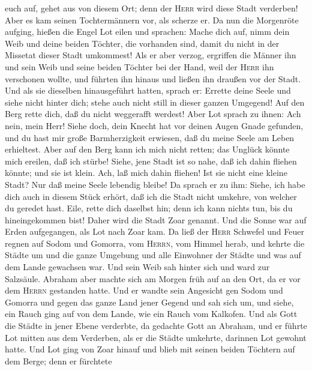euch auf, gehet aus von diesem Ort; denn der \textsc{Herr} wird diese
Stadt verderben! Aber es kam seinen Tochtermännern vor, als scherze er.
 Da nun die Morgenröte aufging, hießen die Engel Lot
eilen und sprachen: Mache dich auf, nimm dein Weib und deine beiden
Töchter, die vorhanden sind, damit du nicht in der Missetat dieser Stadt
umkommest!  Als er aber verzog, ergriffen die Männer ihn
und sein Weib und seine beiden Töchter bei der Hand, weil der
\textsc{Herr} ihn verschonen wollte, und führten ihn hinaus und ließen
ihn draußen vor der Stadt.  Und als sie dieselben
hinausgeführt hatten, sprach er: Errette deine Seele und siehe nicht
hinter dich; stehe auch nicht still in dieser ganzen Umgegend! Auf den
Berg rette dich, daß du nicht weggerafft werdest!  Aber
Lot sprach zu ihnen: Ach nein, mein Herr!  Siehe doch,
dein Knecht hat vor deinen Augen Gnade gefunden, und du hast mir große
Barmherzigkeit erwiesen, daß du meine Seele am Leben erhieltest. Aber
auf den Berg kann ich mich nicht retten; das Unglück könnte mich
ereilen, daß ich stürbe!  Siehe, jene Stadt ist so nahe,
daß ich dahin fliehen könnte; und sie ist klein. Ach, laß mich dahin
fliehen! Ist sie nicht eine kleine Stadt? Nur daß meine Seele lebendig
bleibe!  Da sprach er zu ihm: Siehe, ich habe dich auch
in diesem Stück erhört, daß ich die Stadt nicht umkehre, von welcher du
geredet hast.  Eile, rette dich daselbst hin; denn ich
kann nichts tun, bis du hineingekommen bist! Daher wird die Stadt Zoar
genannt.  Und die Sonne war auf Erden aufgegangen, als
Lot nach Zoar kam.  Da ließ der \textsc{Herr} Schwefel
und Feuer regnen auf Sodom und Gomorra, vom \textsc{Herrn}, vom Himmel
herab,  und kehrte die Städte um und die ganze Umgebung
und alle Einwohner der Städte und was auf dem Lande gewachsen war.
 Und sein Weib sah hinter sich und ward zur Salzsäule.
 Abraham aber machte sich am Morgen früh auf an den Ort,
da er vor dem \textsc{Herrn} gestanden hatte.  Und er
wandte sein Angesicht gen Sodom und Gomorra und gegen das ganze Land
jener Gegend und sah sich um, und siehe, ein Rauch ging auf von dem
Lande, wie ein Rauch vom Kalkofen.  Und als Gott die
Städte in jener Ebene verderbte, da gedachte Gott an Abraham, und er
führte Lot mitten aus dem Verderben, als er die Städte umkehrte,
darinnen Lot gewohnt hatte.  Und Lot ging von Zoar hinauf
und blieb mit seinen beiden Töchtern auf dem Berge; denn er fürchtete

